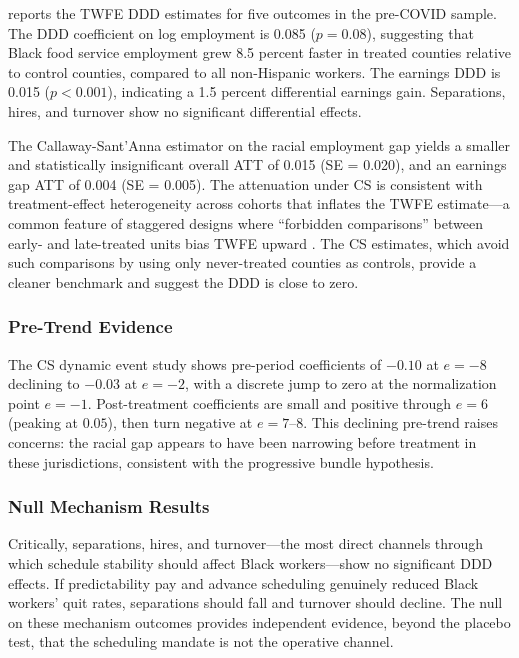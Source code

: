 \documentclass[12pt]{article}
\begin{document}
 reports the TWFE DDD estimates for five outcomes in the pre-COVID sample. The DDD coefficient on log employment is 0.085 ($p = 0.08$), suggesting that Black food service employment grew 8.5 percent faster in treated counties relative to control counties, compared to all non-Hispanic workers. The earnings DDD is 0.015 ($p < 0.001$), indicating a 1.5 percent differential earnings gain. Separations, hires, and turnover show no significant differential effects.



The Callaway-Sant'Anna estimator on the racial employment gap yields a smaller and statistically insignificant overall ATT of 0.015 (SE = 0.020), and an earnings gap ATT of 0.004 (SE = 0.005). The attenuation under CS is consistent with treatment-effect heterogeneity across cohorts that inflates the TWFE estimate---a common feature of staggered designs where ``forbidden comparisons'' between early- and late-treated units bias TWFE upward \citep{goodmanbacon2021}. The CS estimates, which avoid such comparisons by using only never-treated counties as controls, provide a cleaner benchmark and suggest the DDD is close to zero.

\subsubsection*{Pre-Trend Evidence} The CS dynamic event study shows pre-period coefficients of $-0.10$ at $e = -8$ declining to $-0.03$ at $e = -2$, with a discrete jump to zero at the normalization point $e = -1$. Post-treatment coefficients are small and positive through $e = 6$ (peaking at $0.05$), then turn negative at $e = 7$--$8$. This declining pre-trend raises concerns: the racial gap appears to have been narrowing before treatment in these jurisdictions, consistent with the progressive bundle hypothesis.

\subsubsection*{Null Mechanism Results} Critically, separations, hires, and turnover---the most direct channels through which schedule stability should affect Black workers---show no significant DDD effects. If predictability pay and advance scheduling genuinely reduced Black workers' quit rates, separations should fall and turnover should decline. The null on these mechanism outcomes provides independent evidence, beyond the placebo test, that the scheduling mandate is not the operative channel.
\end{document}
